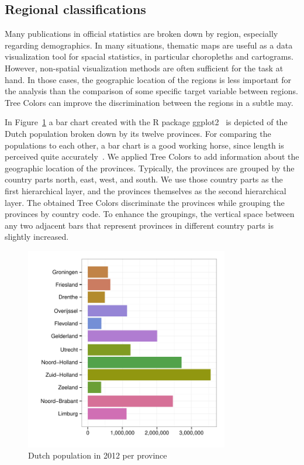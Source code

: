 \documentclass[journal]{vgtc}                %
\begin{document}
\subsection{Regional classifications}
Many publications in official statistics are broken down by region, especially regarding demographics.
In many situations, thematic maps are useful as a data visualization tool for spacial statistics, in particular choropleths and cartograms. However, non-spatial visualization methods are often sufficient for the task at hand. In those cases, the geographic location of the regions is less important for the analysis than the comparison of some specific target variable between regions. Tree Colors can improve the discrimination between the regions in a subtle may.

In Figure~\ref{fig:barApp} a bar chart created with the R package ggplot2~\cite{ggplot2} is depicted of the Dutch population broken down by its twelve provinces. For comparing the populations to each other, a bar chart is a good working horse, since length is perceived quite accurately~\cite{Mackinlay1986}. We applied Tree Colors to add information about the geographic location of the provinces. Typically, the provinces are grouped by the country parts north, east, west, and south. We use those country parts as the first hierarchical layer, and the provinces themselves as the second hierarchical layer. The obtained Tree Colors discriminate the provinces while grouping the provinces by country code. To enhance the groupings, the vertical space between any two adjacent bars that represent provinces in different country parts is slightly increased.

\begin{figure}[tb]
  \centering
  \includegraphics[width=3.5in]{pop_bar.pdf}

  \caption{Dutch population in 2012 per province}\label{fig:barApp}

\end{figure}
\end{document}
